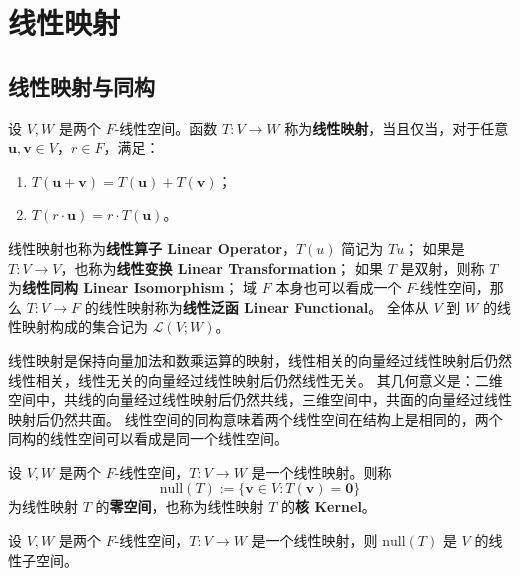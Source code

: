 \section{线性映射}

\subsection{线性映射与同构}

\begin{definition}
    设 $V,W$ 是两个 $F$-线性空间。函数 $T:V\to W$ 称为\textbf{线性映射}，当且仅当，对于任意 $ \mathbf{u},\mathbf{v}\in V $，$ r\in F $，满足：
    \begin{enumerate}
        \item $ T(\mathbf{u}+\mathbf{v}) = T(\mathbf{u}) + T(\mathbf{v}) $；
        \item $ T(r\cdot \mathbf{u}) = r\cdot T(\mathbf{u}) $。
    \end{enumerate}
    线性映射也称为\textbf{线性算子 Linear Operator}，$T(u)$ 简记为 $Tu$；
    如果是 $T:V\to V$，也称为\textbf{线性变换 Linear Transformation}；
    如果 $T$ 是双射，则称 $T$ 为\textbf{线性同构 Linear Isomorphism}；
    域 $F$ 本身也可以看成一个 $F$-线性空间，那么 $T:V\to F$ 的线性映射称为\textbf{线性泛函 Linear Functional}。
    全体从 $V$ 到 $W$ 的线性映射构成的集合记为 $\mathcal{L}(V;W)$。
    \label{def:linear_map}
\end{definition}

\begin{note}
    线性映射是保持向量加法和数乘运算的映射，线性相关的向量经过线性映射后仍然线性相关，线性无关的向量经过线性映射后仍然线性无关。
    其几何意义是：二维空间中，共线的向量经过线性映射后仍然共线，三维空间中，共面的向量经过线性映射后仍然共面。
    线性空间的同构意味着两个线性空间在结构上是相同的，两个同构的线性空间可以看成是同一个线性空间。
\end{note}

\vspace{0.5em}

\begin{definition}
    设 $V,W$ 是两个 $F$-线性空间，$T:V\to W$ 是一个线性映射。则称
    \[
        \mathrm{null}(T) := \{\mathbf{v}\in V : T(\mathbf{v}) = \mathbf{0}\}
    \]
    为线性映射 $T$ 的\textbf{零空间}，也称为线性映射 $T$ 的\textbf{核 Kernel}。
    \label{def:linear_map_zero_space}
\end{definition}

\begin{proposition}[线性映射的零空间是线性子空间]
    设 $V,W$ 是两个 $F$-线性空间，$T:V\to W$ 是一个线性映射，则 $\mathrm{null}(T)$ 是 $V$ 的线性子空间。
\end{proposition}

